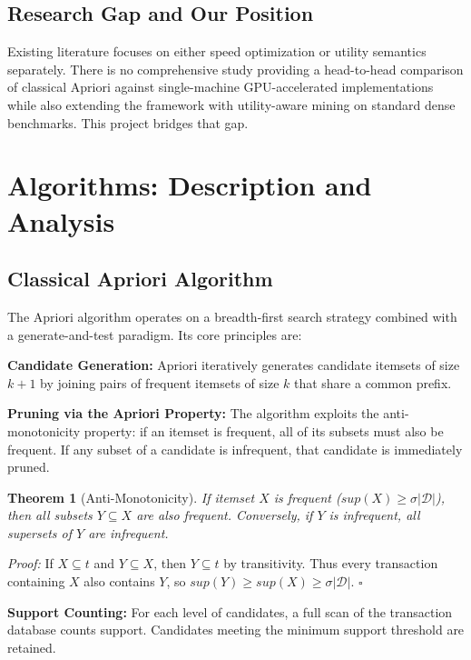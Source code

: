\documentclass[conference]{IEEEtran}
\newtheorem{theorem}{Theorem}
\begin{document}
\subsection{Research Gap and Our Position}
Existing literature focuses on either speed optimization or utility semantics separately. There is no comprehensive study providing a head-to-head comparison of classical Apriori against single-machine GPU-accelerated implementations while also extending the framework with utility-aware mining on standard dense benchmarks. This project bridges that gap.

\section{Algorithms: Description and Analysis}

\subsection{Classical Apriori Algorithm}
The Apriori algorithm operates on a breadth-first search strategy combined with a generate-and-test paradigm. Its core principles are:

\textbf{Candidate Generation:} Apriori iteratively generates candidate itemsets of size $k+1$ by joining pairs of frequent itemsets of size $k$ that share a common prefix.

\textbf{Pruning via the Apriori Property:} The algorithm exploits the anti-monotonicity property: if an itemset is frequent, all of its subsets must also be frequent. If any subset of a candidate is infrequent, that candidate is immediately pruned.

\begin{theorem}[Anti-Monotonicity]
If itemset $X$ is frequent ($sup(X) \geq \sigma|\mathcal{D}|$), then all subsets $Y \subseteq X$ are also frequent. Conversely, if $Y$ is infrequent, all supersets of $Y$ are infrequent.
\end{theorem}

\textit{Proof:} If $X \subseteq t$ and $Y \subseteq X$, then $Y \subseteq t$ by transitivity. Thus every transaction containing $X$ also contains $Y$, so $sup(Y) \geq sup(X) \geq \sigma|\mathcal{D}|$. \hfill $\square$

\textbf{Support Counting:} For each level of candidates, a full scan of the transaction database counts support. Candidates meeting the minimum support threshold are retained.
\end{document}
